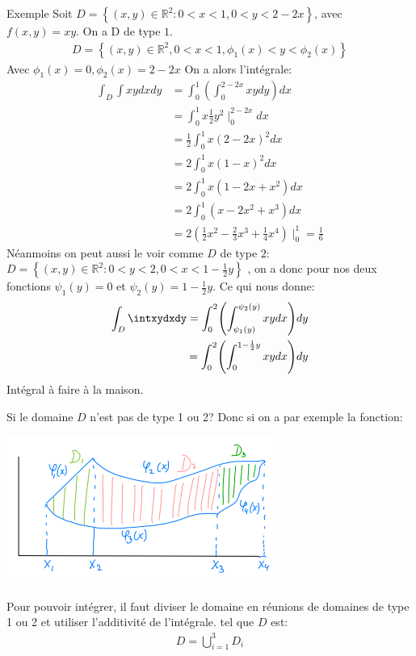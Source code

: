 \begin{parag}{Exemple}
    Soit $D =  \left\{\left(x, y\right) \in  \mathbb{R}^{2}: 0 < x < 1, 0 < y < 2-2x\right\}$, avec $f\left(x, y\right) =  xy$. On a D de type $1$.\\
    \begin{align*} 
        D =  \left\{\left(x, y\right) \in \mathbb{R}^{2}, 0 < x < 1, \phi_1\left(x\right)< y < \phi_2\left(x\right)\right\}
    \end{align*}
    Avec $\phi_1\left(x\right) =  0, \phi_2\left(x\right) =  2 - 2x$ On a alors l'intégrale:
    \begin{align*} 
        \int_D\int xy dxdy &=  \int_0^1\left(\int_0^{2-2x} xydy\right)dx\\ &=  \int_0^1x \frac{1}{2}y^2 \mid_{0}^{2-2x} dx\\
        &= \frac{1}{2}\int_0^1x\left(2-2x\right)^2dx \\ &=  2 \int_0^1x\left(1-x\right)^2 dx\\ &=  2\int_0^1x\left(1-2x + x^2\right) dx\\ &=  2\int_0^1 \left(x-2x^2 + x^3\right) dx\\
        &= 2\left(\frac{1}{2}x^2 - \frac{2}{3}x^3 + \frac{1}{4}x^4\right)\mid_0^1 =  \frac{1}{6}
    \end{align*}
    Néanmoins on peut aussi le voir comme $D$ de type $2$: $D = \left\{\left(x, y\right) \in \mathbb{R}^{2}: 0 < y < 2, 0 < x < 1 - \frac{1}{2}y\right\}$ , on a donc pour nos deux fonctions $\psi_1\left(y\right) = 0$ et $\psi_2\left(y\right) = 1 - \frac{1}{2}y$. Ce qui nous donne:
    \begin{align*} 
        \int_D \intxydxdy =  \int_0^2\left(\int_{\psi_1\left(y\right)}^{\psi_2\left(y\right)}xy dx\right) dy\\
        = \int_0^2\left(\int_0^{1 - \frac{1}{2}y}xydx\right)dy 
    \end{align*}
    Intégral à faire à la maison.
\end{parag}
\begin{parag}{Si le domaine $D$ n'est pas de type 1 ou 2?}
    Donc si on a par exemple la fonction:
    \begin{center}
        \includegraphics[scale=0.7]{32025-05-14.png}
    \end{center}
    
    Pour pouvoir intégrer, il faut diviser le domaine en réunions de domaines de type 1  ou 2 et utiliser l'additivité de l'intégrale. tel que $D$ est:
    \begin{align*} D =  \bigcup_{i =  1}^3 D_i \end{align*}
\end{parag}
